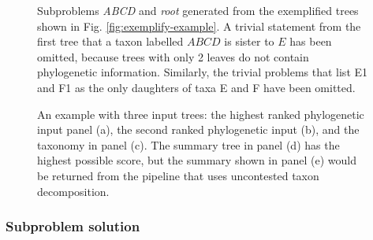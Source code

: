 \documentclass[fleqn,12pt,lineno,english]{wlpeerj}
\begin{document}
\begin{figure}


\caption{Subproblems \emph{ABCD} and \emph{root} generated from the exemplified trees shown in Fig. \ref{fig:exemplify-example}.
A trivial statement from the first tree that a taxon labelled $ABCD$
is sister to $E$ has been omitted, because trees with only 2 leaves
do not contain phylogenetic information.
Similarly, the trivial problems that list E1 and F1 as the only daughters
of taxa E and F have been omitted.}
\label{fig:subproblems-example}
\end{figure}
\begin{figure}
\hfill{}\hfill{}

\hfill{}\hfill{}\hfill{}

\caption{An example with three input trees: the highest ranked phylogenetic
input panel (a), the second ranked phylogenetic input (b), and the
taxonomy in panel (c). The summary tree in panel (d) has the highest
possible score, but the summary shown in panel (e) would be returned
from the pipeline that uses uncontested taxon decomposition.}
\label{fig:decompose-worsens}
\end{figure}


\subsubsection{Subproblem solution\label{subsec:Subproblem-solution}}
\end{document}
